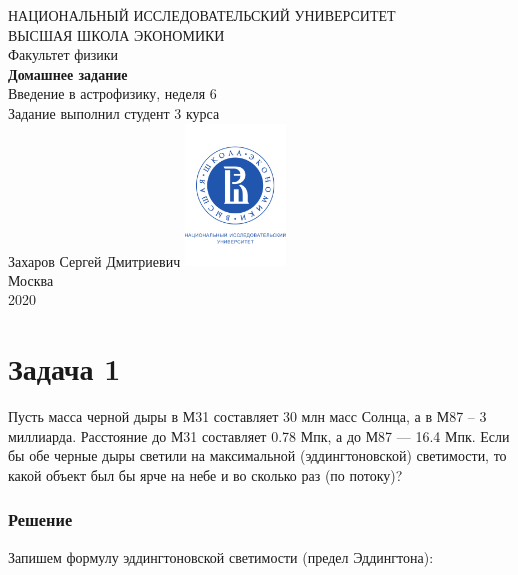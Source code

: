 \documentclass[a4paper, 12pt]{article}
\begin{document}
	\begin{titlepage}
		\begin{center}
			$$$$
			$$$$
			$$$$
			$$$$
			{\Large{НАЦИОНАЛЬНЫЙ ИССЛЕДОВАТЕЛЬСКИЙ УНИВЕРСИТЕТ}}\\
			\vspace{0.1cm}
			{\Large{ВЫСШАЯ ШКОЛА ЭКОНОМИКИ}}\\
			\vspace{0.25cm}
			{\large{Факультет физики}}\\
			\vspace{5.5cm}
			{\Huge\textbf{{Домашнее задание}}}\\%
			\vspace{1cm}
			{\LARGE{Введение в астрофизику, неделя 6}}\\%
			\vspace{2cm}
			{Задание выполнил студент 3 курса}\\
			{Захаров Сергей Дмитриевич}
			\vfill
			\includegraphics[width = 0.2\textwidth]{HSElogo}\\
			\vfill
			Москва\\
			2020
		\end{center}
	\end{titlepage}

\section*{Задача 1}

Пусть масса черной дыры в М31 составляет 30 млн масс Солнца, а в М87 – 3 миллиарда. Расстояние до М31 составляет 0.78 Мпк, а до М87 --- 16.4 Мпк. Если бы обе черные дыры светили на максимальной (эддингтоновской) светимости, то какой объект был бы ярче на небе и во сколько раз (по потоку)?

\subsubsection*{Решение}

Запишем формулу эддингтоновской светимости (предел Эддингтона):
\end{document}
